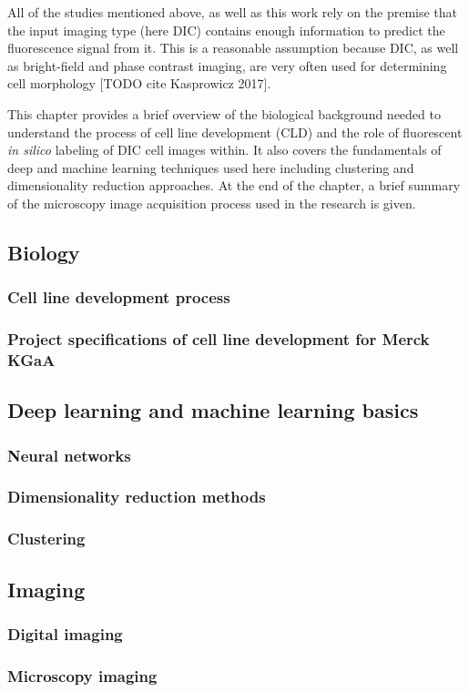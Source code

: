     All of the studies mentioned above, as well as this work rely on the premise that the input imaging type (here DIC) contains enough information to predict the fluorescence signal from it. This is a reasonable assumption because DIC, as well as bright-field and phase contrast imaging, are very often used for determining cell morphology [TODO cite Kasprowicz 2017].

    This chapter provides a brief overview of the biological background needed to understand the process of cell line development (CLD) and the role of fluorescent \textit{in silico} labeling of DIC cell images within. It also covers the fundamentals of deep and machine learning techniques used here including clustering and dimensionality reduction approaches. At the end of the chapter, a brief summary of the microscopy image acquisition process used in the research is given.

    \subsection{Biology}
        \subsubsection{Cell line development process}
        
        \subsubsection{Project specifications of cell line development for Merck KGaA}
        
    \subsection{Deep learning and machine learning basics}\label{subsection:dl}
        \subsubsection{Neural networks}
            
        \subsubsection{Dimensionality reduction methods}
            
        \subsubsection{Clustering}
            
    \subsection{Imaging}
        \subsubsection{Digital imaging}
            
        \subsubsection{Microscopy imaging}
            